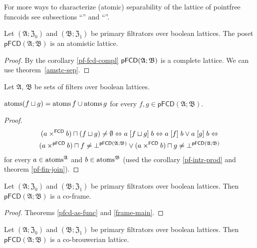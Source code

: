 \begin{rem}
For more ways to characterize (atomic) separability of the lattice
of pointfree funcoids see subsections ``''
and ``''.\end{rem}
\begin{cor}
\label{pf-atomistic}Let $(\mathfrak{A};\mathfrak{Z}_{0})$ and $(\mathfrak{B};\mathfrak{Z}_{1})$
be primary filtrators over boolean lattices. The poset $\mathsf{pFCD}(\mathfrak{A};\mathfrak{B})$
is an atomistic lattice.\end{cor}
\begin{proof}
By the corollary \ref{pf-fcd-compl} $\text{\ensuremath{\mathsf{pFCD}(\mathfrak{A};\mathfrak{B})}}$
is a complete lattice. We can use theorem~\ref{amstc-sep}.\end{proof}
\begin{prop}
Let $\mathfrak{A}$, $\mathfrak{B}$ be sets of filters over boolean
lattices.

$\operatorname{atoms}(f\sqcup g)=\operatorname{atoms} f\cup\operatorname{atoms} g$ for every $f,g\in\mathsf{pFCD}(\mathfrak{A};\mathfrak{B})$.\end{prop}
\begin{proof}
~
\begin{multline*}
(a\times^{\mathsf{FCD}}b)\sqcap(f\sqcup g)\neq\emptyset\Leftrightarrow a\mathrel{\left[f\sqcup g\right]}b\Leftrightarrow a\mathrel{\left[f\right]}b\vee a\mathrel{\left[g\right]}b\Leftrightarrow\\
(a\times^{\mathsf{\mathsf{pFCD}}}b)\sqcap f\neq\bot^{\mathsf{pFCD}(\mathfrak{A};\mathfrak{B})}\vee(a\times^{\mathsf{FCD}}b)\sqcap g\neq\bot^{\mathsf{pFCD}(\mathfrak{A};\mathfrak{B})}
\end{multline*}
for every $a\in\operatorname{atoms}^{\mathfrak{A}}$ and $b\in\operatorname{atoms}^{\mathfrak{B}}$
(used the corollary \ref{pf-intr-prod} and theorem \ref{pf-fin-join}).\end{proof}
\begin{thm}
Let $(\mathfrak{A};\mathfrak{Z}_{0})$ and $(\mathfrak{B};\mathfrak{Z}_{1})$
be primary filtrators over boolean lattices. Then $\mathsf{pFCD}(\mathfrak{A};\mathfrak{B})$
is a co-frame.\end{thm}
\begin{proof}
Theorems \ref{pfcd-as-func} and \ref{frame-main}.\end{proof}
\begin{cor}
Let $(\mathfrak{A};\mathfrak{Z}_{0})$ and $(\mathfrak{B};\mathfrak{Z}_{1})$
be primary filtrators over boolean lattices. Then $\mathsf{pFCD}(\mathfrak{A};\mathfrak{B})$
is a co-brouwerian lattice.\end{cor}
